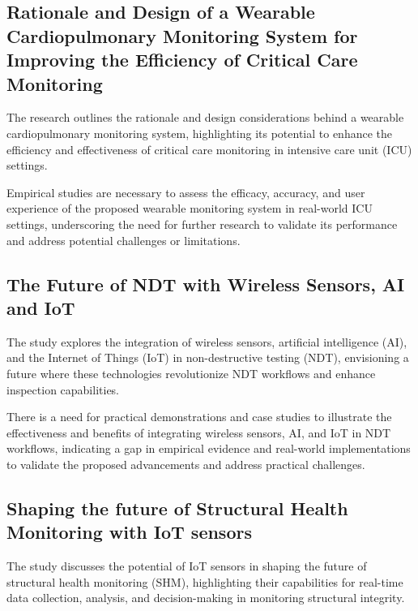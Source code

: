 \documentclass[journal, a4paper]{IEEEtran}
\begin{document}
 
\subsection{Rationale and Design of a Wearable Cardiopulmonary Monitoring System for Improving the Efficiency of Critical Care Monitoring}
The research outlines the rationale and design considerations behind a wearable cardiopulmonary monitoring system, highlighting its potential to enhance the efficiency and effectiveness of critical care monitoring in intensive care unit (ICU) settings. 

\begin{description}[style=standard, font=\normalfont]
  \item[Research gap:] Empirical studies are necessary to assess the efficacy, accuracy, and user experience of the proposed wearable monitoring system in real-world ICU settings, underscoring the need for further research to validate its performance and address potential challenges or limitations.
\end{description}


\subsection{The Future of NDT with Wireless Sensors, AI and IoT}
The study explores the integration of wireless sensors, artificial intelligence (AI), and the Internet of Things (IoT) in non-destructive testing (NDT), envisioning a future where these technologies revolutionize NDT workflows and enhance inspection capabilities. 

\begin{description}[style=standard, font=\normalfont]
  \item[Research gap:] There is a need for practical demonstrations and case studies to illustrate the effectiveness and benefits of integrating wireless sensors, AI, and IoT in NDT workflows, indicating a gap in empirical evidence and real-world implementations to validate the proposed advancements and address practical challenges.
\end{description}


\subsection{Shaping the future of Structural Health Monitoring with IoT sensors}
The study discusses the potential of IoT sensors in shaping the future of structural health monitoring (SHM), highlighting their capabilities for real-time data collection, analysis, and decision-making in monitoring structural integrity. 
\end{document}
